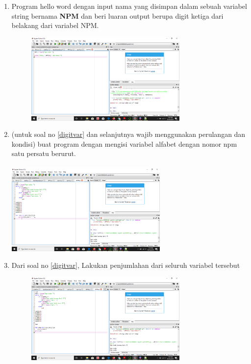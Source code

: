 \begin{enumerate}
\item
Program hello word dengan input nama yang disimpan dalam sebuah variabel string bernama \textbf{NPM} dan beri luaran output berupa digit ketiga dari belakang dari variabel NPM.
\begin{figure}[h]
\centerline{\includegraphics[width=8cm]{gambar/npm4.png}}
\end{figure}


\item
\label{digitvar}
(untuk soal no \ref{digitvar} dan selanjutnya wajib menggunakan perulangan dan kondisi) buat program dengan mengisi variabel alfabet dengan nomor npm satu persatu berurut.
\paragraph{}
\centerline{\includegraphics[width=8cm]{gambar/npm5.png}}


\item
Dari soal no \ref{digitvar}, Lakukan penjumlahan dari seluruh variabel tersebut
\begin{figure}[h]
\centerline{\includegraphics[width=8cm]{gambar/npm6.png}}
\end{figure}



\end{enumerate}
